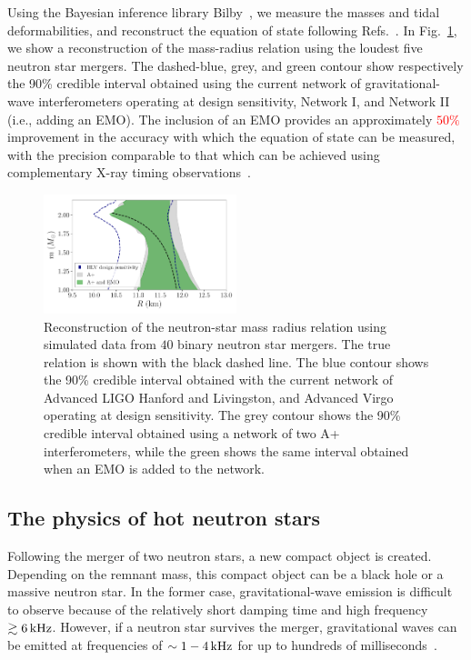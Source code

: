 \documentclass[prx,superscriptaddress,twocolumn,nopreprintnumbers,floatfix,nofootinbib]{revtex4}
\newcommand{\red}[1]{\textcolor{red}{#1}}
\begin{document}
Using the Bayesian inference library Bilby~\cite{ashton19}, we measure the masses and tidal deformabilities, and reconstruct the equation of state following Refs.~\cite{lackey15,hernandez19}.
In Fig.~\ref{fig:mass_radius}, we show a  reconstruction of the mass-radius relation using the loudest five neutron star mergers.
The dashed-blue, grey, and green contour show respectively the 90\% credible interval obtained using the current network of gravitational-wave interferometers operating at design sensitivity, Network I, and Network II (i.e., adding an EMO).  The inclusion of an EMO provides an approximately \red{$50\%$} improvement in the accuracy with which the equation of state can be measured, with the precision comparable to that which can be achieved using complementary X-ray timing observations~\cite[e.g.,][]{bogdanov19}.

\begin{figure}[htb]
\centering
\includegraphics[width=0.5\textwidth]{mass_radius.pdf}
\caption{
Reconstruction of the neutron-star mass radius relation using simulated data from $40$ binary neutron star mergers.
The true relation is shown with the black dashed line.
The blue contour shows the 90\% credible interval obtained with the current network of Advanced LIGO Hanford and Livingston, and Advanced Virgo operating at design sensitivity. The grey contour shows the 90\% credible interval obtained using a network of two A+ interferometers, while the green shows the same interval obtained when an EMO is added to the network.
}
\label{fig:mass_radius}
\end{figure}

\subsection{The physics of hot neutron stars}
Following the merger of two neutron stars, a new compact object is created.  Depending on the remnant mass, this compact object can be a black hole or a massive neutron star.  
In the former case, gravitational-wave emission is difficult to observe because of the relatively short damping time and high frequency $\gtrsim\unit[6]{kHz}$. 
However, if a neutron star survives the merger, gravitational waves can be emitted at frequencies of $\sim\unit[1-4]{kHz}$ for up to hundreds of milliseconds~\cite{Baiotti2008,Shibata2006}.
\end{document}
